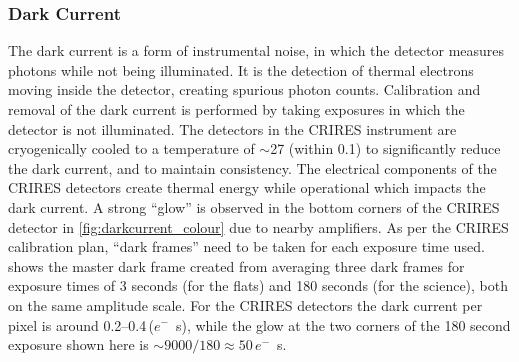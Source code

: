 \subsubsection{Dark Current}
\label{subsubsec:darkcurrent}
The dark current is a form of instrumental noise, in which the detector measures photons while not being illuminated.
It is the detection of thermal electrons moving inside the detector, creating spurious photon counts.
Calibration and removal of the dark current is performed by taking exposures in which the detector is not illuminated.
The detectors in the {CRIRES} instrument are cryogenically cooled to a temperature of \(\sim\)27\K{} (within 0.1\K{}) to significantly reduce the dark current, and to maintain consistency.
The electrical components of the {CRIRES} detectors create thermal energy while operational which impacts the dark current.
A strong ``glow'' is observed in the bottom corners of the {CRIRES} detector in \cref{fig:darkcurrent_colour} due to nearby amplifiers.
As per the {CRIRES} calibration plan, ``dark frames'' need to be taken for each exposure time used.
 shows the master dark frame created from averaging three dark frames for exposure times of 3 seconds (for the flats) and 180 seconds (for the science), both on the same amplitude scale.
For the {CRIRES} detectors the dark current per pixel is around 0.2--0.4\,(\(e^{-}\)\si{\per\second}), while the glow at the two corners of the 180 second exposure shown here is \(\sim\)\(9000 / 180\approx50\)\,\(e^{-}\)\si{\per\second}.

%



